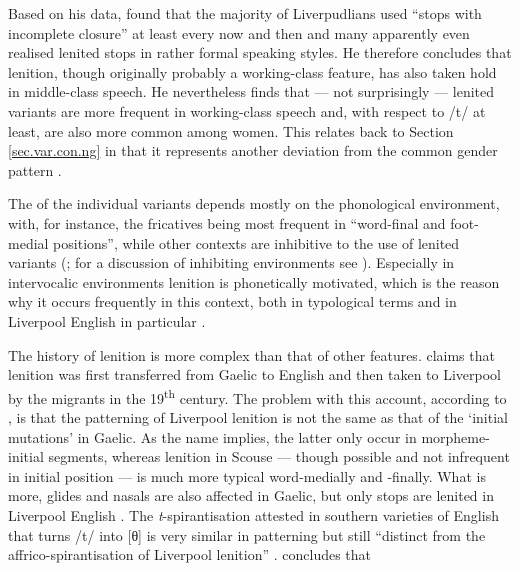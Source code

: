 Based on his \citeyear{knowles1973} data, \citeauthor{knowles1973} found that the majority of Liverpudlians used ``stops with incomplete closure'' at least every now and then and many apparently even realised lenited stops in rather formal speaking styles.
He therefore concludes that lenition, though originally probably a working-class feature, has also taken hold in middle-class speech.
He nevertheless finds that --- not surprisingly --- lenited variants are more frequent in working-class speech and, with respect to /t/ at least, are also more common among women.
This relates back to Section \ref{sec.var.con.ng} in that it represents another deviation from the common gender pattern \citeyearpar[cf.][325--327]{knowles1973}.

The  of the individual variants depends mostly on the phonological environment, with, for instance, the fricatives being most frequent in ``word-final and foot-medial positions'', while other contexts are inhibitive to the use of lenited variants (\citealp[cf.][130]{honeybone2007}; for a discussion of inhibiting environments see \citealt{honeybone2001}).
Especially in intervocalic environments lenition is phonetically motivated, which is the reason why it occurs frequently in this context, both in typological terms and in Liverpool English in particular \parencite[cf.][230 and 243]{honeybone2001}.

The history of lenition is more complex than that of other features.
\textcite{hickey1996} claims that lenition was first transferred from  Gaelic to  English and then taken to Liverpool by the  migrants in the 19\textsuperscript{th} century.
The problem with this account, according to \citet{honeybone2007}, is that the patterning of Liverpool lenition is not the same as that of the `initial mutations' in  Gaelic.
As the name implies, the latter only occur in morpheme-initial segments, whereas lenition in Scouse --- though possible and not infrequent in initial position --- is much more typical word-medially and -finally.
What is more, glides and nasals are also affected in Gaelic, but only stops are lenited in Liverpool English \citep[cf.][131]{honeybone2007}.
The \emph{t}-spirantisation attested in southern varieties of  English that turns /t/ into [θ] is very similar in patterning but still ``distinct from the affrico-spirantisation of Liverpool lenition'' \citep[132]{honeybone2007}.
\citeauthor{honeybone2007} concludes that

